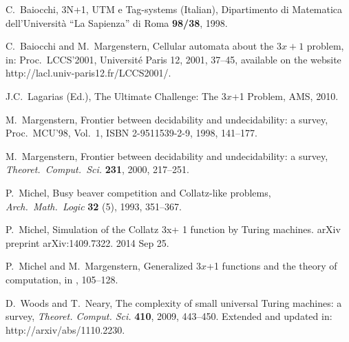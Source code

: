 \documentclass[10pt]{article}
\begin{document}
\begin{thebibliography}{99}
 C.\ Baiocchi, 3N+1, UTM e Tag-systems (Italian),
Dipartimento di Matematica dell'Universit\`a ``La Sapienza'' di Roma {\bf 98/38}, 1998.

 C.\ Baiocchi and M.\ Margenstern, Cellular automata about
the $3x + 1$ problem, in: Proc.\ LCCS'2001, Universit\'e Paris 12, 2001, 37--45,
available on the website http://lacl.univ-paris12.fr/LCCS2001/.

 J.C.\ Lagarias (Ed.), The Ultimate Challenge: The 3$x$+1 Problem, AMS, 2010.

 M.\ Margenstern, Frontier between decidability and undecidability: a survey,
Proc.\ MCU'98, Vol.\ 1, ISBN 2-9511539-2-9, 1998, 141--177.

 M.\ Margenstern, Frontier between decidability and undecidability:
a survey, \emph{Theoret.\ Comput.\ Sci.} {\bf 231}, 2000, 217--251.

 P.\ Michel, Busy beaver competition and Collatz-like problems,
\emph{Arch.\ Math.\ Logic} {\bf 32} (5), 1993, 351--367.

 P.\ Michel, Simulation of the Collatz 3x+ 1 function by Turing machines. arXiv preprint arXiv:1409.7322. 2014 Sep 25.

 P.\ Michel and M.\ Margenstern, Generalized 3$x$+1 functions and the theory of computation,
in \cite{La10}, 105--128.

 D.\ Woods and T.\ Neary, The complexity of small universal Turing machines:
a survey, \emph{Theoret. Comput. Sci.} {\bf 410}, 2009, 443--450.
Extended and updated in: http://arxiv/abs/1110.2230.


\end{thebibliography}
\end{document}
